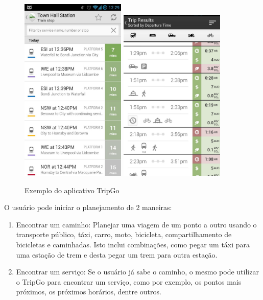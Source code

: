 \begin{figure}[htp]
\begin{center}
  \includegraphics[width=5cm]{images/tripgo1.jpg}
    \includegraphics[width=5cm]{images/tripgo2.png}
  \caption{Exemplo do aplicativo TripGo}
  \label{fig:exampleTripGo}
\end{center}
\end{figure}

O usuário pode iniciar o planejamento de 2 maneiras:

\begin{enumerate}
\item Encontrar um caminho: Planejar uma viagem de um ponto a outro usando o transporte público, táxi, carro, moto, bicicleta, compartilhamento de bicicletas e caminhadas. Isto inclui combinações, como pegar um táxi para uma estação de trem e desta pegar um trem para outra estação.
\item Encontrar um serviço: Se o usuário já sabe o caminho, o mesmo pode utilizar o TripGo para encontrar um serviço, como por exemplo, os pontos mais próximos, os próximos horários, dentre outros.
\end{enumerate}

